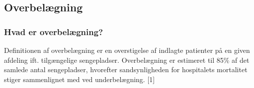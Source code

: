 \subsection{Overbelægning}
\subsubsection{Hvad er overbelægning?}
Definitionen af overbelægning er en overstigelse af indlagte patienter på en given afdeling ift. tilgængelige sengepladser. Overbelægning er estimeret til 85\% af det samlede antal sengepladser, hvorefter sandsynligheden for hospitalets mortalitet  stiger sammenlignet med ved underbelægning. [1]




